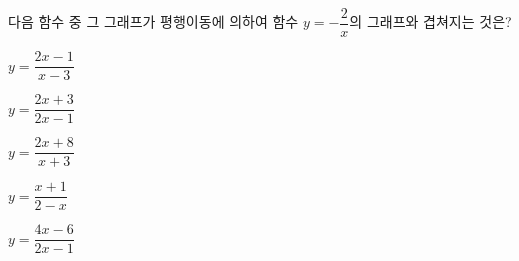 다음 함수 중 그 그래프가 평행이동에 의하여 함수 $y=-\dfrac{2}{x}$의 그래프와 겹쳐지는 것은?
\begin{choices32}{\rule[-3ex]{0pt}{8ex}$y=\dfrac{2x-1}{x-3}$}{\rule[-3ex]{0pt}{8ex}$y=\dfrac{2x+3}{2x-1}$}{\rule[-3ex]{0pt}{8ex}$y=\dfrac{2x+8}{x+3}$}{\rule[-3ex]{0pt}{8ex}$y=\dfrac{x+1}{2-x}$}{\rule[-3ex]{0pt}{8ex}$y=\dfrac{4x-6}{2x-1}$}\end{choices32}
